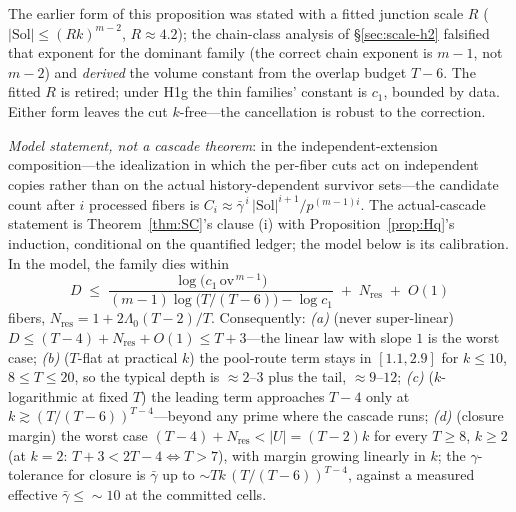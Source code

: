 The earlier form of this proposition was stated with a fitted junction
scale $R$ ($|\mathrm{Sol}|\le(Rk)^{m-2}$, $R\approx4.2$); the chain-class
analysis of \S\ref{sec:scale-h2} falsified that exponent for the
dominant family (the correct chain exponent is $m-1$, not $m-2$) and
\emph{derived} the volume constant from the overlap budget $T-6$. The
fitted $R$ is retired; under H1g the thin families' constant is $c_1$,
bounded by data. Either form leaves the cut $k$-free---the cancellation
is robust to the correction.

\begin{proposition}
\label{prop:depth}
\emph{Model statement, not a cascade theorem}: in the
independent-extension composition---the idealization in which the
per-fiber cuts act on independent copies rather than on the actual
history-dependent survivor sets---the candidate count after $i$
processed fibers is
$C_i\approx\bar\gamma^{\,i}\,|\mathrm{Sol}|^{i+1}/p^{(m-1)i}$. The
actual-cascade statement is Theorem~\ref{thm:SC}'s clause (i) with
Proposition~\ref{prop:Hq}'s induction, conditional on the quantified
ledger; the model below is its calibration. In the model, the family
dies within
\[
D\;\le\;\frac{\log\!\bigl(c_1\,\mathrm{ov}^{\,m-1}\bigr)}
{(m-1)\log\!\bigl(T/(T-6)\bigr)-\log c_1}
\;+\;N_{\mathrm{res}}\;+\;O(1)
\]
fibers, $N_{\mathrm{res}}=1+2\Lambda_0(T-2)/T$. Consequently:
\emph{(a)} (never super-linear) $D\le(T-4)+N_{\mathrm{res}}+O(1)\le
T+3$---the linear law with slope $1$ is the worst case;
\emph{(b)} ($T$-flat at practical $k$) the pool-route term stays in
$[1.1,2.9]$ for $k\le10$, $8\le T\le20$, so the typical depth is
$\approx 2$--$3$ plus the tail, $\approx 9$--$12$;
\emph{(c)} ($k$-logarithmic at fixed $T$) the leading term approaches
$T-4$ only at $k\gtrsim(T/(T-6))^{T-4}$---beyond any prime where the
cascade runs;
\emph{(d)} (closure margin) the worst case $(T-4)+N_{\mathrm{res}}<
|U|=(T-2)k$ for every $T\ge 8$, $k\ge2$ (at $k=2$: $T+3<2T-4\iff
T>7$), with margin growing linearly in $k$; the $\gamma$-tolerance for
closure is $\bar\gamma$ up to $\sim Tk\,(T/(T-6))^{T-4}$, against a
measured effective $\bar\gamma\le\sim\!10$ at the committed cells.
\end{proposition}

